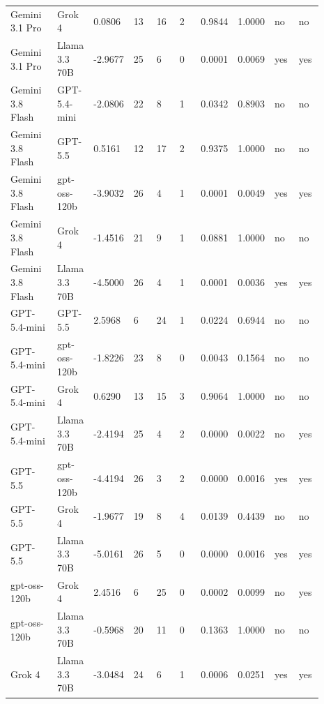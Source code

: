 \begin{landscape}
\begin{longtable}{p{0.162\linewidth}p{0.081\linewidth}p{0.081\linewidth}p{0.081\linewidth}p{0.081\linewidth}p{0.081\linewidth}p{0.081\linewidth}p{0.081\linewidth}p{0.081\linewidth}p{0.081\linewidth}}
Gemini 3.1 Pro & Grok 4 & 0.0806 & 13 & 16 & 2 & 0.9844 & 1.0000 & no & no \\
Gemini 3.1 Pro & Llama 3.3 70B & -2.9677 & 25 & 6 & 0 & 0.0001 & 0.0069 & yes & yes \\
Gemini 3.8 Flash & GPT-5.4-mini & -2.0806 & 22 & 8 & 1 & 0.0342 & 0.8903 & no & no \\
Gemini 3.8 Flash & GPT-5.5 & 0.5161 & 12 & 17 & 2 & 0.9375 & 1.0000 & no & no \\
Gemini 3.8 Flash & gpt-oss-120b & -3.9032 & 26 & 4 & 1 & 0.0001 & 0.0049 & yes & yes \\
Gemini 3.8 Flash & Grok 4 & -1.4516 & 21 & 9 & 1 & 0.0881 & 1.0000 & no & no \\
Gemini 3.8 Flash & Llama 3.3 70B & -4.5000 & 26 & 4 & 1 & 0.0001 & 0.0036 & yes & yes \\
GPT-5.4-mini & GPT-5.5 & 2.5968 & 6 & 24 & 1 & 0.0224 & 0.6944 & no & no \\
GPT-5.4-mini & gpt-oss-120b & -1.8226 & 23 & 8 & 0 & 0.0043 & 0.1564 & no & no \\
GPT-5.4-mini & Grok 4 & 0.6290 & 13 & 15 & 3 & 0.9064 & 1.0000 & no & no \\
GPT-5.4-mini & Llama 3.3 70B & -2.4194 & 25 & 4 & 2 & 0.0000 & 0.0022 & no & yes \\
GPT-5.5 & gpt-oss-120b & -4.4194 & 26 & 3 & 2 & 0.0000 & 0.0016 & yes & yes \\
GPT-5.5 & Grok 4 & -1.9677 & 19 & 8 & 4 & 0.0139 & 0.4439 & no & no \\
GPT-5.5 & Llama 3.3 70B & -5.0161 & 26 & 5 & 0 & 0.0000 & 0.0016 & yes & yes \\
gpt-oss-120b & Grok 4 & 2.4516 & 6 & 25 & 0 & 0.0002 & 0.0099 & no & yes \\
gpt-oss-120b & Llama 3.3 70B & -0.5968 & 20 & 11 & 0 & 0.1363 & 1.0000 & no & no \\
Grok 4 & Llama 3.3 70B & -3.0484 & 24 & 6 & 1 & 0.0006 & 0.0251 & yes & yes \\
\bottomrule
\end{longtable}
\normalsize
\end{landscape}
